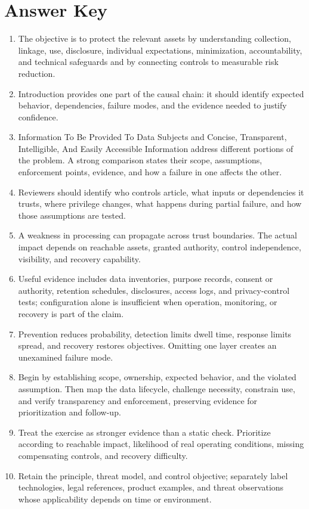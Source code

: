 \documentclass[11pt]{article}
\begin{document}
\section*{Answer Key}
\begin{enumerate}
\item The objective is to protect the relevant assets by understanding collection, linkage, use, disclosure, individual expectations, minimization, accountability, and technical safeguards and by connecting controls to measurable risk reduction.
\item Introduction provides one part of the causal chain: it should identify expected behavior, dependencies, failure modes, and the evidence needed to justify confidence.
\item Information To Be Provided To Data Subjects and Concise, Transparent, Intelligible, And Easily Accessible Information address different portions of the problem. A strong comparison states their scope, assumptions, enforcement points, evidence, and how a failure in one affects the other.
\item Reviewers should identify who controls article, what inputs or dependencies it trusts, where privilege changes, what happens during partial failure, and how those assumptions are tested.
\item A weakness in processing can propagate across trust boundaries. The actual impact depends on reachable assets, granted authority, control independence, visibility, and recovery capability.
\item Useful evidence includes data inventories, purpose records, consent or authority, retention schedules, disclosures, access logs, and privacy-control tests; configuration alone is insufficient when operation, monitoring, or recovery is part of the claim.
\item Prevention reduces probability, detection limits dwell time, response limits spread, and recovery restores objectives. Omitting one layer creates an unexamined failure mode.
\item Begin by establishing scope, ownership, expected behavior, and the violated assumption. Then map the data lifecycle, challenge necessity, constrain use, and verify transparency and enforcement, preserving evidence for prioritization and follow-up.
\item Treat the exercise as stronger evidence than a static check. Prioritize according to reachable impact, likelihood of real operating conditions, missing compensating controls, and recovery difficulty.
\item Retain the principle, threat model, and control objective; separately label technologies, legal references, product examples, and threat observations whose applicability depends on time or environment.
\end{enumerate}
\end{document}
